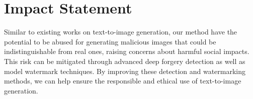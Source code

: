 \section*{Impact Statement}
Similar to existing works on text-to-image generation, our method have the potential to be abused for generating malicious images that could be indistinguishable from real ones, raising concerns about harmful social impacts. This risk can be mitigated through advanced deep forgery detection as well as model watermark techniques. By improving these detection and watermarking methods, we can help ensure the responsible and ethical use of text-to-image generation.
